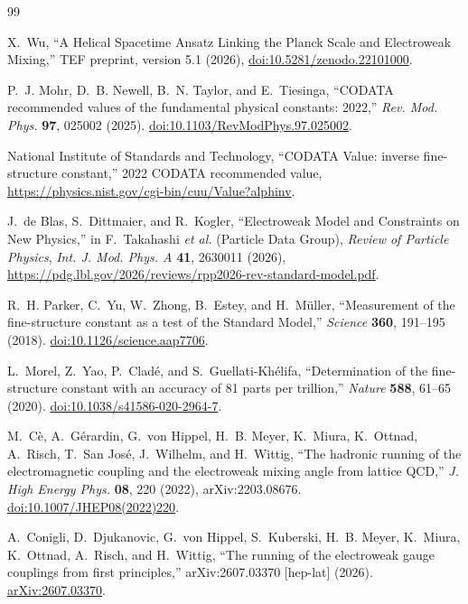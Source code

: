 \documentclass[10pt,twocolumn]{article}
\begin{document}
\balance
\begin{thebibliography}{99}

X.~Wu,
``A Helical Spacetime Ansatz Linking the Planck Scale and Electroweak Mixing,''
TEF preprint, version 5.1 (2026),
\href{https://doi.org/10.5281/zenodo.22101000}{doi:10.5281/zenodo.22101000}.

P.~J. Mohr, D.~B. Newell, B.~N. Taylor, and E.~Tiesinga,
``CODATA recommended values of the fundamental physical constants: 2022,''
\emph{Rev. Mod. Phys.} \textbf{97}, 025002 (2025).
\href{https://doi.org/10.1103/RevModPhys.97.025002}{doi:10.1103/RevModPhys.97.025002}.

National Institute of Standards and Technology,
``CODATA Value: inverse fine-structure constant,'' 2022 CODATA recommended value,
\url{https://physics.nist.gov/cgi-bin/cuu/Value?alphinv}.

J.~de Blas, S.~Dittmaier, and R.~Kogler,
``Electroweak Model and Constraints on New Physics,''
in F.~Takahashi \emph{et al.} (Particle Data Group),
\emph{Review of Particle Physics}, \emph{Int. J. Mod. Phys. A} \textbf{41}, 2630011 (2026),
\url{https://pdg.lbl.gov/2026/reviews/rpp2026-rev-standard-model.pdf}.

R.~H. Parker, C.~Yu, W.~Zhong, B.~Estey, and H.~M\"uller,
``Measurement of the fine-structure constant as a test of the Standard Model,''
\emph{Science} \textbf{360}, 191--195 (2018).
\href{https://doi.org/10.1126/science.aap7706}{doi:10.1126/science.aap7706}.

L.~Morel, Z.~Yao, P.~Clad\'e, and S.~Guellati-Kh\'elifa,
``Determination of the fine-structure constant with an accuracy of 81 parts per trillion,''
\emph{Nature} \textbf{588}, 61--65 (2020).
\href{https://doi.org/10.1038/s41586-020-2964-7}{doi:10.1038/s41586-020-2964-7}.

M.~C\`e, A.~G\'erardin, G.~von Hippel, H.~B. Meyer, K.~Miura, K.~Ottnad,
A.~Risch, T.~San Jos\'e, J.~Wilhelm, and H.~Wittig,
``The hadronic running of the electromagnetic coupling and the electroweak mixing angle from lattice QCD,''
\emph{J. High Energy Phys.} \textbf{08}, 220 (2022), arXiv:2203.08676.
\href{https://doi.org/10.1007/JHEP08(2022)220}{doi:10.1007/JHEP08(2022)220}.

A.~Conigli, D.~Djukanovic, G.~von Hippel, S.~Kuberski, H.~B. Meyer, K.~Miura,
K.~Ottnad, A.~Risch, and H.~Wittig,
``The running of the electroweak gauge couplings from first principles,''
arXiv:2607.03370 [hep-lat] (2026).
\href{https://arxiv.org/abs/2607.03370}{arXiv:2607.03370}.


\end{thebibliography}
\end{document}
